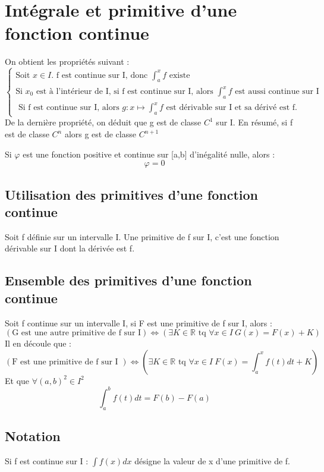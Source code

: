 \section{Intégrale et primitive d'une fonction continue}
On obtient les propriétés suivant : 
\[\left\{\begin{array}{l}
   \mbox{Soit } x \in I.\mbox{ f est continue sur I, donc } \int_a^x f \mbox{ existe} \\
   \mbox{Si } x_0 \mbox{ est à l'intérieur de I, si f est continue sur I, alors } \int_a^x f \mbox { est aussi continue sur I} \\
   \mbox{ Si f est continue sur I, alors } g : x \mapsto \int_a^x f \mbox{ est dérivable sur I et sa dérivé est f.}
  \end{array}\right.
\]
De la dernière propriété, on déduit que g est de classe $C^1$ sur I. En résumé, si f est de classe $C^n$ alors g est de classe $C^{n+1}$
\begin{prop}
Si $\varphi$ est une fonction positive et continue sur [a,b] d'inégalité nulle, alors :
$$\varphi = 0$$
\end{prop}

\subsection{Utilisation des primitives d'une fonction continue}
\begin{de}
 Soit f définie sur un intervalle I. Une primitive de f sur I, c'est une fonction dérivable sur I dont la dérivée est f.
\end{de}
\subsection{Ensemble des primitives d'une fonction continue}
Soit f continue sur un intervalle I, si F est une primitive de f sur I, alors :
$$(\mbox{G est une autre primitive de f sur I}) \Leftrightarrow (\exists K \in \mathbb{R} \mbox{ tq } \forall x \in I~ G(x)=F(x)+K)$$
Il en découle que : 
$$( \mbox{F est une primitive de f sur I }) \Leftrightarrow (\exists K \in \mathbb{R} \mbox{ tq } \forall x \in I~ F(x)=\int_a^x f(t)dt + K)$$
Et que $\forall (a,b)^2 \in I^2$
$$\int_a^b f(t)dt = F(b) - F(a)$$
\subsection{Notation}
\begin{de}
 Si f est continue sur I : $\int f(x)dx$ désigne la valeur de x d'une primitive de f.
\end{de}
